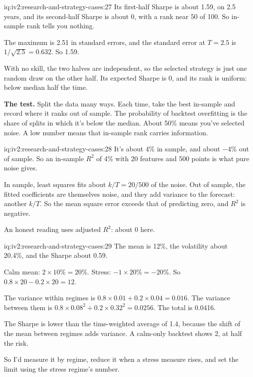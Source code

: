 \begin{solution}{iq:iv2:research-and-strategy-cases:27}
Its first-half Sharpe is about 1.59, on 2.5 years, and its second-half Sharpe is about 0, with a rank near 50 of 100. So in-sample rank tells you nothing.

The maximum is 2.51 in standard errors, and the standard error at $T = 2.5$ is $1/\sqrt{2.5} = 0.632$. So 1.59.

With no skill, the two halves are independent, so the selected strategy is just one random draw on the other half. Its expected Sharpe is 0, and its rank is uniform: below median half the time.

\textbf{The test.} Split the data many ways. Each time, take the best in-sample and record where it ranks out of sample. The probability of backtest overfitting is the share of splits in which it's below the median. About 50\% means you've selected noise. A low number means that in-sample rank carries information.

\end{solution}

\begin{solution}{iq:iv2:research-and-strategy-cases:28}
It's about 4\% in sample, and about $-4\%$ out of sample. So an in-sample $R^2$ of 4\% with 20 features and 500 points is what pure noise gives.

In sample, least squares fits about $k/T = 20/500$ of the noise. Out of sample, the fitted coefficients are themselves noise, and they add variance to the forecast: another $k/T$. So the mean square error exceeds that of predicting zero, and $R^2$ is negative.

An honest reading uses adjusted $R^2$: about 0 here.

\end{solution}

\begin{solution}{iq:iv2:research-and-strategy-cases:29}
The mean is 12\%, the volatility about 20.4\%, and the Sharpe about 0.59.

Calm mean: $2 \times 10\% = 20\%$. Stress: $-1 \times 20\% = -20\%$. So $0.8 \times 20 - 0.2 \times 20 = 12$.

The variance within regimes is $0.8 \times 0.01 + 0.2 \times 0.04 = 0.016$. The variance between them is $0.8 \times 0.08^2 + 0.2 \times 0.32^2 = 0.0256$. The total is 0.0416.

The Sharpe is lower than the time-weighted average of 1.4, because the shift of the mean between regimes adds variance. A calm-only backtest shows 2, at half the risk.

So I'd measure it by regime, reduce it when a stress measure rises, and set the limit using the stress regime's number.

\end{solution}

